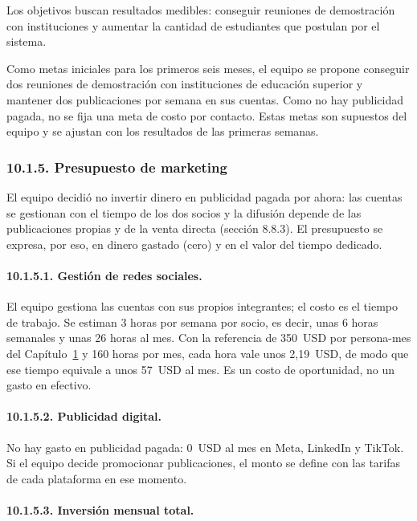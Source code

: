 Los objetivos buscan resultados medibles: conseguir reuniones de demostración con instituciones y aumentar la cantidad de estudiantes que postulan por el sistema.

Como metas iniciales para los primeros seis meses, el equipo se propone conseguir dos reuniones de demostración con instituciones de educación superior y mantener dos publicaciones por semana en sus cuentas. Como no hay publicidad pagada, no se fija una meta de costo por contacto. Estas metas son supuestos del equipo y se ajustan con los resultados de las primeras semanas.

\subsubsection{10.1.5. Presupuesto de marketing}

El equipo decidió no invertir dinero en publicidad pagada por ahora: las cuentas se gestionan con el tiempo de los dos socios y la difusión depende de las publicaciones propias y de la venta directa (sección 8.8.3). El presupuesto se expresa, por eso, en dinero gastado (cero) y en el valor del tiempo dedicado.

\paragraph{10.1.5.1. Gestión de redes sociales.}

El equipo gestiona las cuentas con sus propios integrantes; el costo es el tiempo de trabajo. Se estiman 3 horas por semana por socio, es decir, unas 6 horas semanales y unas 26 horas al mes. Con la referencia de 350~USD por persona-mes del Capítulo~\hyperref[cap:paps]{1} y 160 horas por mes, cada hora vale unos 2,19~USD, de modo que ese tiempo equivale a unos 57~USD al mes. Es un costo de oportunidad, no un gasto en efectivo.

\paragraph{10.1.5.2. Publicidad digital.}

No hay gasto en publicidad pagada: 0~USD al mes en Meta, LinkedIn y TikTok. Si el equipo decide promocionar publicaciones, el monto se define con las tarifas de cada plataforma en ese momento.

\paragraph{10.1.5.3. Inversión mensual total.}

